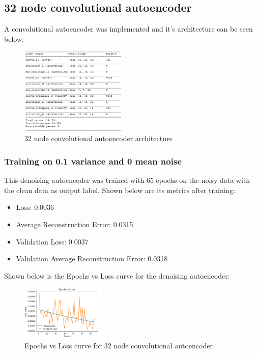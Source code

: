 \documentclass[conference]{IEEEtran}
\begin{document}
    \subsection{32 node convolutional autoencoder}

    A convolutional autoencoder was implemented and it's architecture can be seen below:

    \begin{figure}[H]
        \centering
        \captionsetup{justification=centering}
        \centering
            \includegraphics[width=0.45\textwidth]{23.png}
            \caption{32 node convolutional autoencoder architecture}
    \end{figure}

    \subsubsection{Training on 0.1 variance and 0 mean noise\\}

    This denoising autoencoder was trained with 65 epochs on the noisy data with the clean data as output label. Shown below
    are its metrics after training:

    \begin{itemize}
        \item Loss: 0.0036
        \item Average Reconstruction Error: 0.0315
        \item Validation Loss: 0.0037
        \item Validation Average Reconstruction Error: 0.0318
    \end{itemize}

    Shown below is the Epochs vs Loss curve for the denoising autoencoder:

    \begin{figure}[H]
        \centering
        \captionsetup{justification=centering}
        \centering
            \includegraphics[width=0.35\textwidth]{24.png}
            \caption{Epochs vs Loss curve for 32 node convolutional autoencoder}
    \end{figure}
\end{document}
